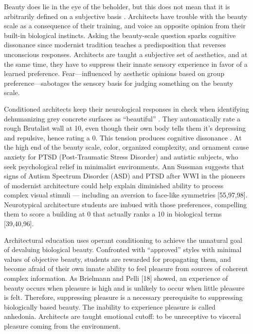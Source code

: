 \documentclass[a4paper]{article}
\begin{document}
Beauty does lie in the eye of the beholder, but this does not mean that it is arbitrarily defined on a subjective basis \cite{norman_introduction_2004}. Architects have trouble with the beauty scale as a consequence of their training, and voice an opposite opinion from their built-in biological instincts. Asking the beauty-scale question sparks cognitive dissonance since modernist tradition teaches a predisposition that reverses unconscious responses. Architects are taught a subjective set of aesthetics, and at the same time, they have to suppress their innate sensory experience in favor of a learned preference. Fear—influenced by aesthetic opinions based on group preference—sabotages the sensory basis for judging something on the beauty scale.

Conditioned architects keep their neurological responses in check when identifying dehumanizing grey concrete surfaces as “beautiful” \cite{curl_duel_2019}. They automatically rate a rough Brutalist wall at 10, even though their own body tells them it’s depressing and repulsive, hence rating a 0. This tension produces cognitive dissonance \cite{salingaros_cognitive_2014}. At the high end of the beauty scale, color, organized complexity, and ornament cause anxiety for PTSD (Post-Traumatic Stress Disorder) and autistic subjects, who seek psychological relief in minimalist environments. Ann Sussman suggests that signs of Autism Spectrum Disorder (ASD) and PTSD after WWI in the pioneers of modernist architecture could help explain diminished ability to process complex visual stimuli — including an aversion to face-like symmetries [55,97,98]. Neurotypical architecture students are imbued with those preferences, compelling them to score a building at 0 that actually ranks a 10 in biological terms [39,40,96].

Architectural education uses operant conditioning to achieve the unnatural goal of devaluing biological beauty. Confronted with “approved” styles with minimal values of objective beauty, students are rewarded for propagating them, and become afraid of their own innate ability to feel pleasure from sources of coherent complex information. As Brielmann and Pelli [18] showed, an experience of beauty occurs when pleasure is high and is unlikely to occur when little pleasure is felt. Therefore, suppressing pleasure is a necessary prerequisite to suppressing biologically based beauty. The inability to experience pleasure is called anhedonia. Architects are taught emotional cutoff: to be unreceptive to visceral pleasure coming from the environment.
\end{document}
